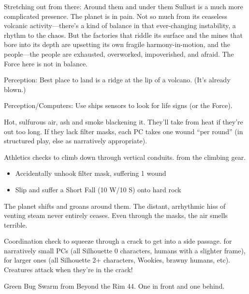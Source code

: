 \documentclass[background]{book}
\newcommand{\df}{\DifficultyDie}
\begin{document}
\begin{multicols}{2}
Stretching out from there: Around them and under them Sullust is a much more complicated presence. The planet is in pain. Not so much from its ceaseless volcanic activity—there’s a kind of balance in that ever-changing instability, a rhythm to the chaos. But the factories that riddle its surface and the mines that bore into its depth are upsetting its own fragile harmony-in-motion, and the people—the people are exhausted, overworked, impoverished, and afraid. The Force here is not in balance.


\difficulty\difficulty\difficulty\setback Perception: Best place to land is a ridge at the lip of a volcano. (It’s already blown.)

\difficulty\difficulty\difficulty\setback Perception/Computers: Use ships sensors to look for life signs (or the Force).

Hot, sulfurous air, ash and smoke blackening it. They’ll take \setback\setback from heat if they’re out too long.  If they lack filter masks, each PC takes one wound ``per round'' (in structured play, else as narratively appropriate).

\difficulty\difficulty\difficulty Athletics checks to climb down through vertical conduits. \boost from the climbing gear.
\begin{itemize}
  \item \threat\threat Accidentally unhook filter mask, suffering 1 wound
  \item \despair Slip and suffer a  Short Fall (10 W/10 S) onto hard rock
\end{itemize}

The planet shifts and groans around them. The distant, arrhythmic hiss of venting steam never entirely ceases. Even through the masks, the air smells terrible.

\df\df Coordination check to squeeze through a crack to get into a side passage. \boost for narratively small PCs (all Silhouette 0 characters, humans with a slighter frame), \setback for larger ones (all Silhouette 2+ characters, Wookies, brawny humans, etc). Creatures attack when they’re in the crack!

Green Bug Swarm from Beyond the Rim 44.  One in front and one behind.


\end{multicols}
\end{document}
